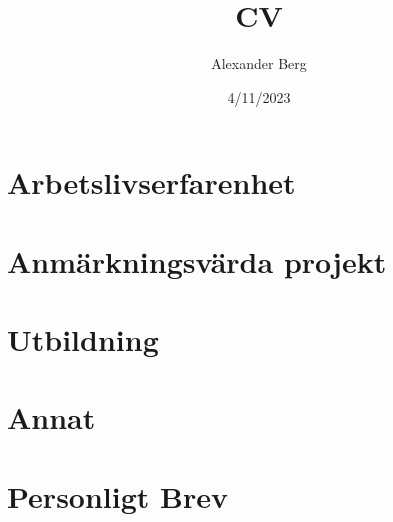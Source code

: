 \documentclass{Style}
\title{CV}
\author{Alexander Berg}
\date{4/11/2023}
\begin{document}


\section{Arbetslivserfarenhet}



\section{Anmärkningsvärda projekt}



\section{Utbildning}



\section{Annat}




\titlerule

\newpage

\section{Personligt Brev}






\end{document}
